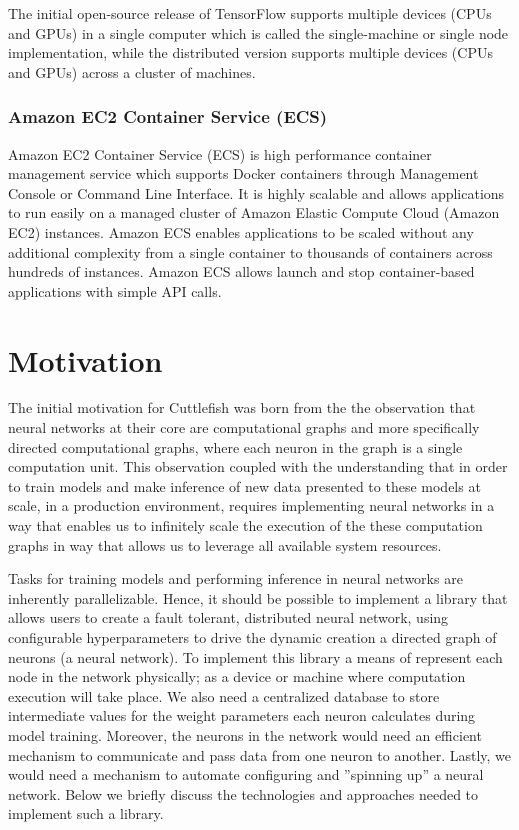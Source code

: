 \documentclass[conference]{IEEEtran}
\begin{document}
The initial open-source release of TensorFlow supports multiple devices (CPUs and GPUs) in a single computer which is called the single-machine or single node implementation, while the distributed version supports multiple devices (CPUs and GPUs) across a cluster of machines.

\subsubsection{Amazon EC2 Container Service (ECS)}
Amazon EC2 Container Service (ECS) is high performance container management service which supports Docker containers through Management Console or Command Line Interface. It is highly scalable and allows applications to run easily on a managed cluster of Amazon Elastic Compute Cloud (Amazon EC2) instances. Amazon ECS enables applications to be scaled without any additional complexity from a single container to thousands of containers across hundreds of instances. Amazon ECS allows launch and stop container-based applications with simple API calls. 

\section{Motivation}
The initial motivation for Cuttlefish was born from the the observation that neural networks at their core are computational graphs and more specifically directed computational graphs, where each neuron in the graph is a single computation unit. This observation coupled with the understanding that in order to train models and make inference of new data presented to these models at scale, in a production environment, requires implementing neural networks in a way that enables us to infinitely scale the execution of the these computation graphs in way that allows us to leverage all available system resources.  

Tasks for training models and performing inference in neural networks are inherently parallelizable. Hence, it should be possible to implement a library that allows users to create a fault tolerant, distributed neural network, using configurable hyperparameters to drive the dynamic creation a directed graph of neurons (a neural network).  To implement this library a means of represent each node in the network physically; as a device or machine where computation execution will take place. We also need a centralized database to store intermediate values for the weight parameters each neuron calculates during model training. Moreover, the neurons in the network would need an efficient mechanism to communicate and pass data from one neuron to another. Lastly, we would need a mechanism to automate configuring and ''spinning up'' a neural network.  Below we briefly discuss the technologies and approaches needed to implement such a library.
\end{document}
